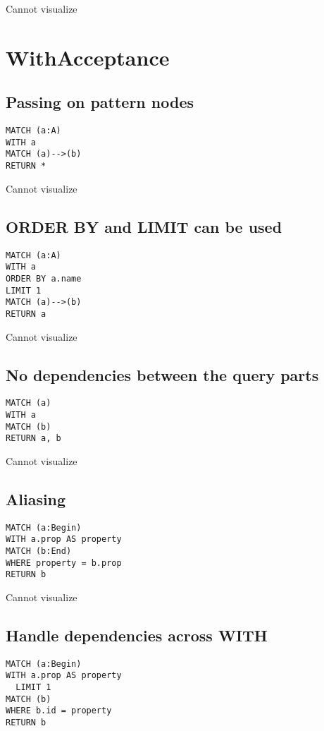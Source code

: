 Cannot visualize
\section{WithAcceptance}

\subsection{Passing on pattern nodes}

\begin{lstlisting}
MATCH (a:A)
WITH a
MATCH (a)-->(b)
RETURN *
\end{lstlisting}

Cannot visualize
\subsection{ORDER BY and LIMIT can be used}

\begin{lstlisting}
MATCH (a:A)
WITH a
ORDER BY a.name
LIMIT 1
MATCH (a)-->(b)
RETURN a
\end{lstlisting}

Cannot visualize
\subsection{No dependencies between the query parts}

\begin{lstlisting}
MATCH (a)
WITH a
MATCH (b)
RETURN a, b
\end{lstlisting}

Cannot visualize
\subsection{Aliasing}

\begin{lstlisting}
MATCH (a:Begin)
WITH a.prop AS property
MATCH (b:End)
WHERE property = b.prop
RETURN b
\end{lstlisting}

Cannot visualize
\subsection{Handle dependencies across WITH}

\begin{lstlisting}
MATCH (a:Begin)
WITH a.prop AS property
  LIMIT 1
MATCH (b)
WHERE b.id = property
RETURN b
\end{lstlisting}

